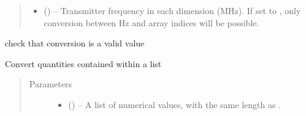 \documentclass[letterpaper,10pt,english]{sphinxmanual}
\begin{document}
\begin{fulllineitems}
\begin{quote}
\begin{description}
\begin{itemize}
\item {} 
\sphinxAtStartPar
{} (\sphinxstyleliteralemphasis{\sphinxupquote{{[}}}\sphinxstyleliteralemphasis{\sphinxupquote{{]} or }}\sphinxstyleliteralemphasis{\sphinxupquote{{[}}}\sphinxstyleliteralemphasis{\sphinxupquote{, }}\sphinxstyleliteralemphasis{\sphinxupquote{{]} or }}\sphinxstyleliteralemphasis{\sphinxupquote{, }}) – Transmitter frequency in each dimension (MHz). If set to , only
conversion between Hz and array indices will be possible.

\end{itemize}

\end{description}\end{quote}

\begin{fulllineitems}
\label{\detokenize{references/misc:nmrespy._misc.FrequencyConverter._check_valid_conversion}}
\sphinxAtStartPar
check that conversion is a valid value

\end{fulllineitems}


\begin{fulllineitems}
\label{\detokenize{references/misc:nmrespy._misc.FrequencyConverter.convert}}
\sphinxAtStartPar
Convert quantities contained within a list
\begin{quote}\begin{description}
\item[{Parameters}] \leavevmode\begin{itemize}
\item {} 
\sphinxAtStartPar
{} () – A list of numerical values, with the same length as .


\end{itemize}
\end{description}
\end{quote}
\end{fulllineitems}
\end{fulllineitems}
\end{document}
